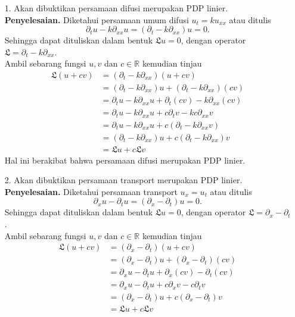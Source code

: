 \documentclass[11pt,a4paper]{article}
\newcommand{\ds}{\displaystyle}
\theoremstyle{plain}
\theoremstyle{definition}
\theoremstyle{remark}
\newcommand{\R}{\mathbb{R}}
\newcommand{\LL}{\mathfrak{L}}
\begin{document}
\begin{enumerate}
	\item[1.] Akan dibuktikan persamaan difusi merupakan PDP linier. \- \\
	\textbf{Penyelesaian.} Diketahui persamaan umum difusi $u_{t}=ku_{xx}$ atau ditulis $$ \partial_{t} u - k \partial_{xx}u = (\partial_{t}-k \partial_{xx})u = 0.$$
	Sehingga dapat dituliskan dalam bentuk $\LL u=0$, dengan operator $\ds \LL = \partial_{t}-k \partial_{xx}$.\\
	Ambil sebarang fungsi $u,v$ dan $c\in \R$ kemudian tinjau
	\begin{align*}
	\LL(u+cv) &=  (\partial_{t}-k \partial_{xx})(u+cv) \\
	&=  (\partial_{t}-k \partial_{xx})u +(\partial_{t}-k \partial_{xx})(cv) \\
	&= \partial_{t}u-k \partial_{xx}u + \partial_{t}(cv)-k \partial_{xx}(cv) \\
	&= \partial_{t}u-k \partial_{xx}u + c \partial_{t}v-k  c \partial_{xx}v \\
	&= \partial_{t}u-k \partial_{xx}u + c(\partial_{t} - k \partial_{xx}v) \\
	&= (\partial_{t}- k \partial_{xx}) u + c(\partial_{t} - k  \partial_{xx}) v \\
	&= \LL u + c\LL v
	\end{align*}
	Hal ini berakibat bahwa persamaan difusi merupakan PDP linier.
	\item[2.] Akan dibuktikan persamaan transport merupakan PDP linier. \- \\
	\textbf{Penyelesaian.} Diketahui persamaan transport $u_{x}=u_{t}$ atau ditulis $$ \partial_{x} u - \partial_{t}u = (\partial_{x}-\partial_{t})u = 0.$$
	Sehingga dapat dituliskan dalam bentuk $\LL u=0$, dengan operator $\ds \LL = \partial_{x}-\partial_{t}$.\\
	Ambil sebarang fungsi $u,v$ dan $c\in \R$ kemudian tinjau 
	\begin{align*}
	\LL(u+cv) &=  (\partial_{x}-\partial_{t})(u+cv) \\
	&=  (\partial_{x}-\partial_{t})u +(\partial_{x}-\partial_{t})(cv) \\
	&= \partial_{x}u-\partial_{t}u + \partial_{x}(cv)-\partial_{t}(cv) \\
	&= \partial_{x}u-\partial_{t}u + c \partial_{x}v - c \partial_{t}v \\
	&= (\partial_{x}- \partial_{t}) u + c(\partial_{x} - \partial_{t}) v \\
	&= \LL u + c\LL v
	\end{align*}

\end{enumerate}
\end{document}
